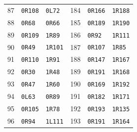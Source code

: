 \begin{longtable}{@{}rll@{\hspace{2em}}rll@{}}
87 & \texttt{0R108} & \texttt{0L72} & 184 & \texttt{0R166} & \texttt{1R188}\\
88 & \texttt{0R68} & \texttt{0R66} & 185 & \texttt{0R189} & \texttt{1R190}\\
89 & \texttt{0R109} & \texttt{1R89} & 186 & \texttt{0R92} & \texttt{1R111}\\
90 & \texttt{0R49} & \texttt{1R101} & 187 & \texttt{0R107} & \texttt{1R85}\\
91 & \texttt{0R110} & \texttt{1R91} & 188 & \texttt{0R147} & \texttt{1R167}\\
92 & \texttt{0R30} & \texttt{1R48} & 189 & \texttt{0R191} & \texttt{1R168}\\
93 & \texttt{0R47} & \texttt{1R60} & 190 & \texttt{0R169} & \texttt{1R192}\\
94 & \texttt{0L63} & \texttt{0R89} & 191 & \texttt{0R182} & \texttt{1R171}\\
95 & \texttt{0R105} & \texttt{1R78} & 192 & \texttt{0R193} & \texttt{1R135}\\
96 & \texttt{0R94} & \texttt{1L111} & 193 & \texttt{0R191} & \texttt{1R164}\\
\bottomrule
\end{longtable}
\endgroup
\clearpage
